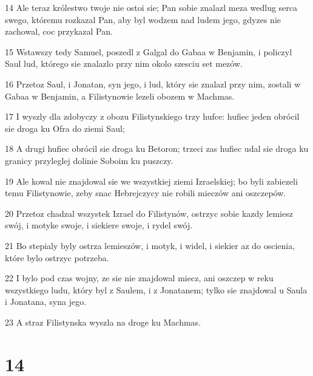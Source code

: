 \par 14 Ale teraz królestwo twoje nie ostoi sie; Pan sobie znalazl meza wedlug serca swego, któremu rozkazal Pan, aby byl wodzem nad ludem jego, gdyzes nie zachowal, coc przykazal Pan.
\par 15 Wstawszy tedy Samuel, poszedl z Galgal do Gabaa w Benjamin, i policzyl Saul lud, którego sie znalazlo przy nim okolo szesciu set mezów.
\par 16 Przetoz Saul, i Jonatan, syn jego, i lud, który sie znalazl przy nim, zostali w Gabaa w Benjamin, a Filistynowie lezeli obozem w Machmas.
\par 17 I wyszly dla zdobyczy z obozu Filistynskiego trzy hufce: hufiec jeden obrócil sie droga ku Ofra do ziemi Saul;
\par 18 A drugi hufiec obrócil sie droga ku Betoron; trzeci zas hufiec udal sie droga ku granicy przyleglej dolinie Soboim ku puszczy.
\par 19 Ale kowal nie znajdowal sie we wszystkiej ziemi Izraelskiej; bo byli zabiezeli temu Filistynowie, zeby snac Hebrejczycy nie robili mieczów ani oszczepów.
\par 20 Przetoz chadzal wszystek Izrael do Filistynów, ostrzyc sobie kazdy lemiesz swój, i motyke swoje, i siekiere swoje, i rydel swój.
\par 21 Bo stepialy byly ostrza lemieszów, i motyk, i widel, i siekier az do oscienia, które bylo ostrzyc potrzeba.
\par 22 I bylo pod czas wojny, ze sie nie znajdowal miecz, ani oszczep w reku wszystkiego ludu, który byl z Saulem, i z Jonatanem; tylko sie znajdowal u Saula i Jonatana, syna jego.
\par 23 A straz Filistynska wyszla na droge ku Machmas.

\chapter{14}

